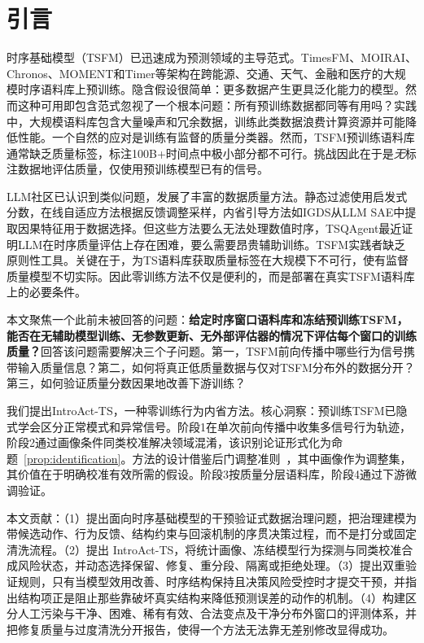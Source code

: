 \documentclass{article}
\begin{document}
\section{引言}

时序基础模型（TSFM）已迅速成为预测领域的主导范式。TimesFM、MOIRAI、Chronos、MOMENT和Timer等架构在跨能源、交通、天气、金融和医疗的大规模时序语料库上预训练。隐含假设很简单：更多数据产生更具泛化能力的模型。然而这种可用即包含范式忽视了一个根本问题：所有预训练数据都同等有用吗？实践中，大规模语料库包含大量噪声和冗余数据，训练此类数据浪费计算资源并可能降低性能。一个自然的应对是训练有监督的质量分类器。然而，TSFM预训练语料库通常缺乏质量标签，标注100B+时间点中极小部分都不可行。挑战因此在于是\emph{无}标注数据地评估质量，仅使用预训练模型已有的信号。

LLM社区已认识到类似问题，发展了丰富的数据质量方法。静态过滤使用启发式分数，在线自适应方法根据反馈调整采样，内省引导方法如IGDS从LLM SAE中提取因果特征用于数据选择。但这些方法要么无法处理数值时序，TSQAgent最近证明LLM在时序质量评估上存在困难，要么需要昂贵辅助训练。TSFM实践者缺乏原则性工具。关键在于，为TS语料库获取质量标签在大规模下不可行，使有监督质量模型不切实际。因此零训练方法不仅是便利的，而是部署在真实TSFM语料库上的必要条件。

本文聚焦一个此前未被回答的问题：\textbf{给定时序窗口语料库和冻结预训练TSFM，能否在无辅助模型训练、无参数更新、无外部评估器的情况下评估每个窗口的训练质量？}回答该问题需要解决三个子问题。第一，TSFM前向传播中哪些行为信号携带输入质量信息？第二，如何将真正低质量数据与仅对TSFM分布外的数据分开？第三，如何验证质量分数因果地改善下游训练？

我们提出IntroAct-TS，一种零训练行为内省方法。核心洞察：预训练TSFM已隐式学会区分正常模式和异常信号。阶段1在单次前向传播中收集多信号行为轨迹，阶段2通过画像条件同类校准解决领域混淆，该识别论证形式化为命题~\ref{prop:identification}。方法的设计借鉴后门调整准则~\citep{pearl2009causality}，其中画像作为调整集，其价值在于明确校准有效所需的假设。阶段3按质量分层语料库，阶段4通过下游微调验证。

本文贡献：（1）提出面向时序基础模型的干预验证式数据治理问题，把治理建模为带候选动作、行为反馈、结构约束与回滚机制的序贯决策过程，而不是打分或固定清洗流程。（2）提出 IntroAct-TS，将统计画像、冻结模型行为探测与同类校准合成风险状态，并动态选择保留、修复、重分段、隔离或拒绝处理。（3）提出双重验证规则，只有当模型效用改善、时序结构保持且决策风险受控时才提交干预，并指出结构项正是阻止那些靠破坏真实结构来降低预测误差的动作的机制。（4）构建区分人工污染与干净、困难、稀有有效、合法变点及干净分布外窗口的评测体系，并把修复质量与过度清洗分开报告，使得一个方法无法靠无差别修改显得成功。
\end{document}
